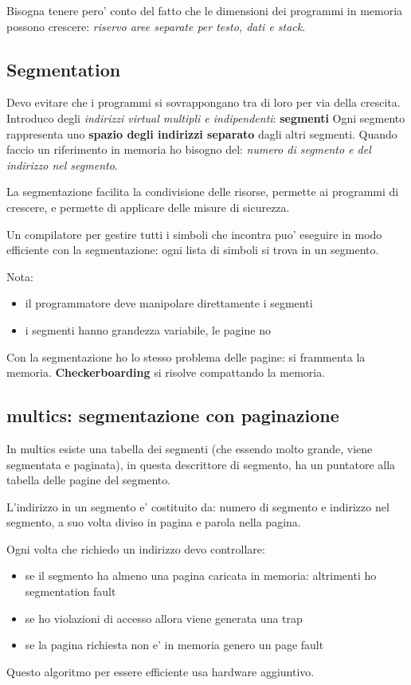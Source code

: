 Bisogna tenere pero' conto del fatto che le dimensioni dei programmi in memoria possono crescere: \textit{riservo aree separate per testo, dati e stack}.

\subsection{Segmentation}
Devo evitare che i programmi si sovrappongano tra di loro per via della crescita. Introduco degli \textit{indirizzi virtual multipli e indipendenti}: \textbf{segmenti}
Ogni segmento rappresenta uno \textbf{spazio degli indirizzi separato} dagli altri segmenti. 
Quando faccio un riferimento in memoria ho bisogno del: \textit{numero di segmento e del indirizzo nel segmento}.

La segmentazione facilita la condivisione delle risorse, permette ai programmi di crescere, e permette di applicare delle
misure di sicurezza.

Un compilatore per gestire tutti i simboli che incontra puo' eseguire in modo efficiente con la segmentazione:
ogni lista di simboli si trova in un segmento.

Nota:
\begin{itemize}
    \item il programmatore deve manipolare direttamente i segmenti
    \item i segmenti hanno grandezza variabile, le pagine no
\end{itemize}

Con la segmentazione ho lo stesso problema delle pagine: si frammenta la memoria. \textbf{Checkerboarding} si
risolve compattando la memoria.

\subsection{multics: segmentazione con paginazione}
In multics esiste una tabella dei segmenti (che essendo molto grande, viene segmentata e paginata),
in questa descrittore di segmento, ha un puntatore alla tabella delle pagine del segmento.

L'indirizzo in un segmento e' costituito da: numero di segmento e indirizzo nel segmento, a suo volta diviso
in pagina e parola nella pagina.

Ogni volta che richiedo un indirizzo devo controllare:
\begin{itemize}
    \item se il segmento ha almeno una pagina caricata in memoria: altrimenti ho segmentation fault
    \item se ho violazioni di accesso allora viene generata una trap
    \item se la pagina richiesta non e' in memoria genero un page fault
\end{itemize}

Questo algoritmo per essere efficiente usa hardware aggiuntivo.